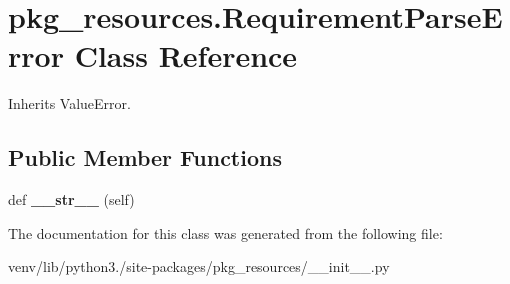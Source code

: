 \hypertarget{classpkg__resources_1_1_requirement_parse_error}{}\section{pkg\+\_\+resources.\+Requirement\+Parse\+Error Class Reference}
\label{classpkg__resources_1_1_requirement_parse_error}


Inherits Value\+Error.

\subsection*{Public Member Functions}
\begin{DoxyCompactItemize}
\item 
\mbox{\label{classpkg__resources_1_1_requirement_parse_error_afc3620e7751c56285346ec0d5772ec82}} 
def {\bfseries \+\_\+\+\_\+str\+\_\+\+\_\+} (self)
\end{DoxyCompactItemize}


The documentation for this class was generated from the following file\+:\begin{DoxyCompactItemize}
\item 
venv/lib/python3./site-\/packages/pkg\+\_\+resources/\+\_\+\+\_\+init\+\_\+\+\_\+.\+py\end{DoxyCompactItemize}
